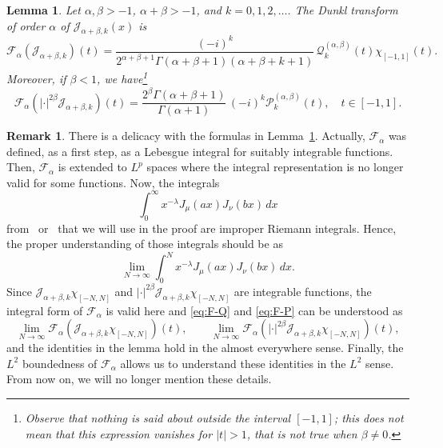 \documentclass[11pt,a4paper]{amsart}
\theoremstyle{plain}
\newtheorem{Lem}{Lemma}%
\theoremstyle{definition}
\newtheorem{Rem}{Remark}
\newcommand{\calF}{\mathcal{F}}
\newcommand{\calJ}{\mathcal{J}}
\newcommand{\calP}{\mathcal{P}}
\newcommand{\calQ}{\mathcal{Q}}
\begin{document}
\begin{Lem}
\label{lem:F-PQ}
Let $\alpha,\beta > -1$, $\alpha+\beta>-1$,
and $k = 0,1,2,\dots$. The Dunkl transform of order $\alpha$ of
$\calJ_{\alpha+\beta,k}(x)$ is
\begin{equation}
\label{eq:F-Q}
  \calF_{\alpha}(\calJ_{\alpha+\beta,k})(t)
  = \frac{(-i)^k}{2^{\alpha+\beta+1}\Gamma(\alpha+\beta+1)(\alpha+\beta+k+1)}
  \, \calQ^{(\alpha,\beta)}_{k}(t)\chi_{[-1,1]}(t).
\end{equation}
Moreover, if $\beta<1$, we have\footnote{Observe that nothing is
said about outside the interval $[-1,1]$; this does not mean that this
expression vanishes for $|t|>1$, that is not true when 
$\beta \ne 0$.}
\begin{equation}
\label{eq:F-P}
  \calF_{\alpha}(|\cdot|^{2\beta}\calJ_{\alpha+\beta,k})(t)
  = \frac{2^\beta \Gamma(\alpha+\beta+1)}{\Gamma(\alpha+1)}
  \, (-i)^k \calP^{(\alpha,\beta)}_{k}(t),\quad t\in [-1,1].
\end{equation}
\end{Lem}


\begin{Rem}
\label{rem:Ntoinfty}
There is a delicacy with the formulas in Lemma~\ref{lem:F-PQ}. 
Actually, $\calF_{\alpha}$ was defined, as a
first step, as a Lebesgue integral for suitably integrable functions. Then,
$\calF_{\alpha}$ is extended to $L^p$ spaces where the integral representation is no
longer valid for some functions. Now, the integrals 
\begin{equation*}
  \int_{0}^{\infty}x^{-\lambda }J_{\mu }(ax)J_{\nu }(bx)\,dx
\end{equation*}
from~\cite[Ch.~8.11]{E-TIT-II} or~\cite[Ch.~XIII]{Wat}
that we will use in the proof are improper Riemann integrals. Hence, the proper understanding
of those integrals should be as
\begin{equation*}
  \lim_{N\to\infty}
  \int_{0}^{N} x^{-\lambda }J_{\mu }(ax)J_{\nu }(bx)\,dx.
\end{equation*}
Since $\calJ_{\alpha+\beta,k} \chi_{[-N,N]}$ and 
$|\cdot|^{2\beta}\calJ_{\alpha+\beta,k} \chi_{[-N,N]}$
are integrable functions, the integral form
of $\calF_{\alpha}$ is valid here and \eqref{eq:F-Q} and \eqref{eq:F-P}
can be understood as
\begin{equation*}
  \lim_{N\to\infty} \calF_{\alpha}(\calJ_{\alpha+\beta,k} \chi_{[-N,N]})(t),
  \qquad
  \lim_{N\to\infty} \calF_{\alpha}(|\cdot|^{2\beta}\calJ_{\alpha+\beta,k} \chi_{[-N,N]})(t),
\end{equation*}
and the identities in the lemma hold in the almost everywhere sense. 
Finally, the $L^2$ boundedness of $\calF_{\alpha}$ allows us to understand
these identities in the $L^2$ sense.
From now on, we will no longer mention these details.
\end{Rem}
\end{document}
